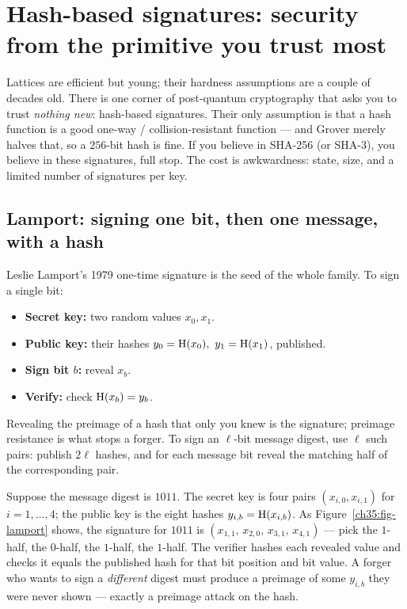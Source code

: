 \section{Hash-based signatures: security from the primitive you trust most}
\label{ch35:hash-sigs}

Lattices are efficient but young; their hardness assumptions are a couple of decades old. There is one corner of post-quantum cryptography that asks you to trust \emph{nothing new}: hash-based signatures. Their only assumption is that a hash function is a good one-way / collision-resistant function --- and Grover merely halves that, so a $256$-bit hash is fine. If you believe in SHA-256 (or SHA-3), you believe in these signatures, full stop. The cost is awkwardness: state, size, and a limited number of signatures per key.

\subsection{Lamport: signing one bit, then one message, with a hash}
\label{ch35:lamport}

Leslie Lamport's 1979 one-time signature is the seed of the whole family. To sign a single bit:
\begin{itemize}
  \item \textbf{Secret key:} two random values $x_0, x_1$.
  \item \textbf{Public key:} their hashes $y_0=\operatorname{H}(x_0),\ y_1=\operatorname{H}(x_1)$, published.
  \item \textbf{Sign bit $b$:} reveal $x_b$.
  \item \textbf{Verify:} check $\operatorname{H}(x_b)=y_b$.
\end{itemize}
Revealing the preimage of a hash that only you knew is the signature; preimage resistance is what stops a forger. To sign an $\ell$-bit message digest, use $\ell$ such pairs: publish $2\ell$ hashes, and for each message bit reveal the matching half of the corresponding pair.

\begin{example}
\label{ch35:ex-lamport}
Suppose the message digest is $1011$. The secret key is four pairs $(x_{i,0},x_{i,1})$ for $i=1,\dots,4$; the public key is the eight hashes $y_{i,b}=\operatorname{H}(x_{i,b})$. As Figure~\ref{ch35:fig-lamport} shows, the signature for $1011$ is $(x_{1,1},\,x_{2,0},\,x_{3,1},\,x_{4,1})$ --- pick the $1$-half, the $0$-half, the $1$-half, the $1$-half. The verifier hashes each revealed value and checks it equals the published hash for that bit position and bit value. A forger who wants to sign a \emph{different} digest must produce a preimage of some $y_{i,b}$ they were never shown --- exactly a preimage attack on the hash.
\end{example}

